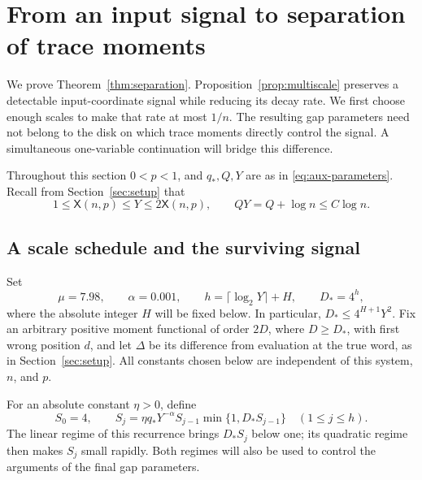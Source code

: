 \section{From an input signal to separation of trace moments}
\label{sec:separation}

We prove Theorem~\ref{thm:separation}.  Proposition~\ref{prop:multiscale}
preserves a detectable input-coordinate signal while reducing its decay
rate.  We first choose enough scales to make that rate at most $1/n$.
The resulting gap parameters need not belong to the disk on which trace
moments directly control the signal.  A simultaneous one-variable
continuation will bridge this difference.

Throughout this section $0<p<1$, and $q_*,Q,Y$ are as in
\eqref{eq:aux-parameters}.  Recall from Section~\ref{sec:setup} that
\begin{equation}
  1\le \mathsf X(n,p)\le Y\le 2\mathsf X(n,p),
  \qquad QY=Q+\log n\le C\log n.
  \label{eq:aux-comparisons}
\end{equation}
\subsection{A scale schedule and the surviving signal}

Set
\begin{equation}
  \mu=7.98,\qquad \alpha=0.001,\qquad
  h=\lceil\log_2Y\rceil+H,\qquad D_*=4^h,
  \label{eq:separation-cutoff}
\end{equation}
where the absolute integer $H$ will be fixed below.  In particular,
$D_*\le4^{H+1}Y^2$.  Fix an arbitrary positive moment functional of
order $2D$, where $D\ge D_*$, with first wrong position $d$,
and let $\Delta$ be its
difference from evaluation at the true word, as in Section~\ref{sec:setup}.
All constants chosen below are independent of this system, $n$, and $p$.

For an absolute constant $\eta>0$, define
\begin{equation}
 S_0=4,\qquad
 S_j=\eta q_*Y^{-\alpha}S_{j-1}
               \min\{1,D_*S_{j-1}\}\quad(1\le j\le h).
 \label{eq:scale-schedule}
\end{equation}
The linear regime of this recurrence brings $D_*S_j$ below one; its
quadratic regime then makes $S_j$ small rapidly.  Both regimes will also
be used to control the arguments of the final gap parameters.

